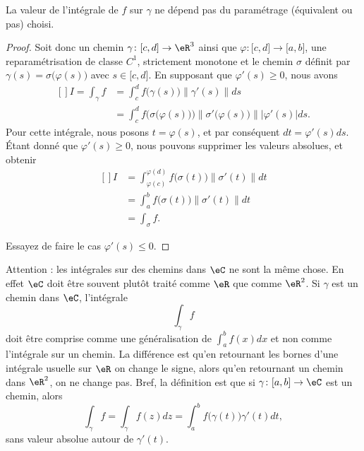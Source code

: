 \begin{proposition}
    La valeur de l'intégrale de $f$ sur $\gamma$ ne dépend pas du paramétrage (équivalent ou pas) choisi.
\end{proposition}

\begin{proof}
    Soit donc un chemin \( \gamma\colon \mathopen[ c , d \mathclose]\to \eR^3\) ainsi que $\varphi\colon \mathopen[ c , d \mathclose]\to \mathopen[ a , b \mathclose]$, une reparamétrisation de classe $C^1$, strictement monotone et le chemin \( \sigma\) définit par $\gamma(s)=\sigma\big( \varphi(s) \big)$ avec $s\in\mathopen[ c , d \mathclose]$. En supposant que $\varphi'(s)\geq 0$, nous avons
    \begin{equation}
        \begin{aligned}[]
            I=\int_{\gamma}f&=\int_c^df\big( \gamma(s) \big)\| \gamma'(s) \|ds\\
            &=\int_c^df\Big( \sigma\big( \varphi(s) \big) \Big)\| \sigma'\big( \varphi(s) \big) \| |\varphi'(s) |ds.
        \end{aligned}
    \end{equation}
    Pour cette intégrale, nous posons $t=\varphi(s)$, et par conséquent $dt=\varphi'(s)ds$. Étant donné que $\varphi'(s)\geq 0$, nous pouvons supprimer les valeurs absolues, et obtenir
    \begin{equation}
        \begin{aligned}[]
            I&=\int_{\varphi(c)}^{\varphi(d)}f\big( \sigma(t) \big)\| \sigma'(t) \|dt\\
            &=\int_a^bf\big( \sigma(t) \big)\| \sigma'(t) \|dt\\
            &=\int_{\sigma}f.
        \end{aligned}
    \end{equation}

    Essayez de faire le cas $\varphi'(s)\leq 0$.
\end{proof}

\begin{remark}      \label{RemiqswPd}
    Attention : les intégrales sur des chemins dans \( \eC\) ne sont la même chose. En effet \( \eC\) doit être souvent plutôt traité comme \( \eR\) que comme \( \eR^2\). Si \( \gamma\) est un chemin dans \( \eC\), l'intégrale
    \begin{equation}
        \int_{\gamma}f
    \end{equation}
    doit être comprise comme une généralisation de \( \int_a^bf(x)dx\) et non comme l'intégrale sur un chemin. La différence est qu'en retournant les bornes d'une intégrale usuelle sur \( \eR\) on change le signe, alors qu'en retournant un chemin dans \( \eR^2\), on ne change pas. Bref, la définition est que si \( \gamma\colon \mathopen[ a , b \mathclose]\to \eC\) est un chemin, alors
    \begin{equation}
        \int_{\gamma}f=\int_{\gamma}f(z)dz=\int_a^bf\big( \gamma(t) \big)\gamma'(t)dt,
    \end{equation}
    sans valeur absolue autour de \( \gamma'(t)\).
\end{remark}

